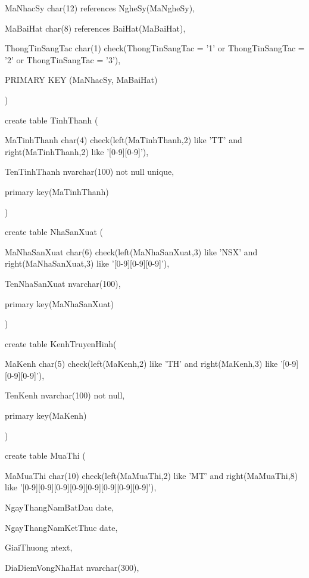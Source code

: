 \documentclass{report}
\begin{document}
	\setlength{\parindent}{1.5cm}
	MaNhacSy char(12) references NgheSy(MaNgheSy),
	
	MaBaiHat char(8) references BaiHat(MaBaiHat),
	
	ThongTinSangTac char(1) check(ThongTinSangTac = '1' or ThongTinSangTac = '2' or ThongTinSangTac = '3'),
	
	PRIMARY KEY (MaNhacSy, MaBaiHat)
	
	\setlength{\parindent}{0.5cm}
)

\bigskip

create table TinhThanh (

	\setlength{\parindent}{1.5cm}
	MaTinhThanh char(4) check(left(MaTinhThanh,2) like 'TT' and right(MaTinhThanh,2) like '[0-9][0-9]'),
	
	TenTinhThanh nvarchar(100) not null unique,
	
	primary key(MaTinhThanh)
	
	\setlength{\parindent}{0.5cm}
)

\bigskip

create table NhaSanXuat (

	\setlength{\parindent}{1.5cm}
	MaNhaSanXuat char(6) check(left(MaNhaSanXuat,3) like 'NSX' and right(MaNhaSanXuat,3) like '[0-9][0-9][0-9]'),
	
	TenNhaSanXuat nvarchar(100),
	
	primary key(MaNhaSanXuat)
	
	\setlength{\parindent}{0.5cm}
)

\bigskip

create table KenhTruyenHinh(

	\setlength{\parindent}{1.5cm}
	MaKenh char(5) check(left(MaKenh,2) like 'TH' and right(MaKenh,3) like '[0-9][0-9][0-9]'),
	
	TenKenh nvarchar(100) not null,
	
	primary key(MaKenh)
	
	\setlength{\parindent}{0.5cm}
)

\bigskip

create table MuaThi (

	\setlength{\parindent}{1.5cm}
	MaMuaThi char(10) check(left(MaMuaThi,2) like 'MT' and right(MaMuaThi,8) like '[0-9][0-9][0-9][0-9][0-9][0-9][0-9][0-9]'),
	
	NgayThangNamBatDau date,
	
	NgayThangNamKetThuc date,
	
	GiaiThuong ntext,
	
	DiaDiemVongNhaHat nvarchar(300),
	
\end{document}
